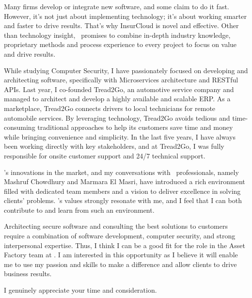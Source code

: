 \documentclass[11pt, a4paper]{awesome-cv}
\begin{document}
\begin{cvletter}
\begin{letterbodyen}
  
    Many firms develop or integrate new software, and some claim to do it fast. However, it's not just about implementing technology; it's about working smarter and faster to drive results. That's why InsurCloud is novel and effective. Other than technology insight, \putcompanyname \ promises to combine in-depth industry knowledge, proprietary methods and process experience to every project to focus on value and drive results.

    While studying Computer Security, I have passionately focused on developing and architecting software, specifically with Microservices architecture and RESTful APIs. Last year, I co-founded Tread2Go, an automotive service company and managed to architect and develop a highly available and scalable ERP. As a marketplace, Tread2Go connects drivers to local technicians for remote automobile services. By leveraging technology, Tread2Go avoids tedious and time-consuming traditional approaches to help its customers save time and money while bringing convenience and simplicity. In the last five years, I have always been working directly with key stakeholders, and at Tread2Go, I was fully responsible for onsite customer support and 24/7 technical support.
    
    \putcompanyname's innovations in the market, and my conversations with \putcompanyname \ professionals, namely Mashruf Chowdhury and Marmara El Masri, have introduced a rich environment filled with dedicated team members and a vision to deliver excellence in solving clients' problems. \putcompanyname's values strongly resonate with me, and I feel that I can both contribute to and learn from such an environment.
    
    Architecting secure software and consulting the best solutions to customers require a combination of software development, computer security, and strong interpersonal expertise. Thus, I think I can be a good fit for the \putposition role in the Asset Factory team at \putcompanyname. I am interested in this opportunity as I believe it will enable me to use my passion and skills to make a difference and allow clients to drive business results.

    I genuinely appreciate your time and consideration.

  \end{letterbodyen}
\makeletterclosing

\end{cvletter}
\end{document}
